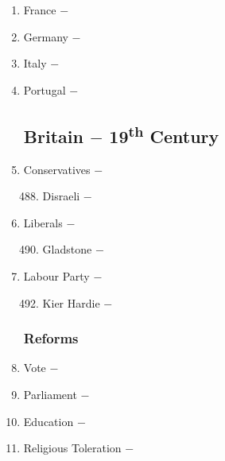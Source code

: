 \documentclass[12pt]{article}
\begin{document}
\begin{enumerate}
\item France $-$ 

\item Germany $-$ 

\item Italy $-$ 

\item Portugal $-$ 

\subsection{Britain $-$ 19\textsuperscript{th} Century}

\item Conservatives $-$ 

\begin{enumerate}[label=\arabic{*}.]
\setcounter{enumii}{487}

\item Disraeli $-$

\end{enumerate}
\setcounter{enumi}{488}

\item Liberals $-$ 

\begin{enumerate}[label=\arabic{*}.]
\setcounter{enumii}{489}

\item Gladstone $-$

\end{enumerate}
\setcounter{enumi}{490}

\item Labour Party $-$

\begin{enumerate}[label=\arabic{*}.]
\setcounter{enumii}{491}

\item Kier Hardie $-$ 

\end{enumerate}
\setcounter{enumi}{492}

\subsubsection{Reforms}

\item Vote $-$ 

\item Parliament $-$ 

\item Education $-$ 

\item Religious Toleration $-$ 


\end{enumerate}
\end{document}
